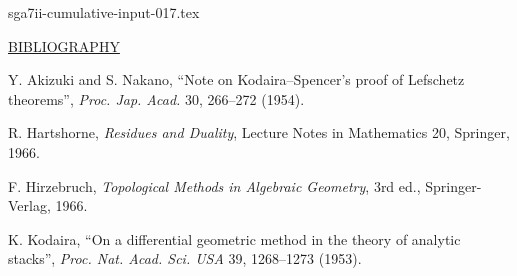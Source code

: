 \begin{filecontents*}{sga7ii-cumulative-input-017.tex}

\bigskip
\begin{center}
\underline{BIBLIOGRAPHY}
\end{center}

\begin{enumerate}[label={[\arabic*]},leftmargin=3em]
\item Y. Akizuki and S. Nakano, ``Note on Kodaira--Spencer's proof of
Lefschetz theorems'', \emph{Proc. Jap. Acad.} 30, 266--272 (1954).

\item R. Hartshorne, \emph{Residues and Duality}, Lecture Notes in
Mathematics 20, Springer, 1966.

\item F. Hirzebruch, \emph{Topological Methods in Algebraic Geometry},
3rd ed., Springer-Verlag, 1966.

\item K. Kodaira, ``On a differential geometric method in the theory of
analytic stacks'', \emph{Proc. Nat. Acad. Sci. USA} 39, 1268--1273
(1953).
\end{enumerate}
\end{filecontents*}
